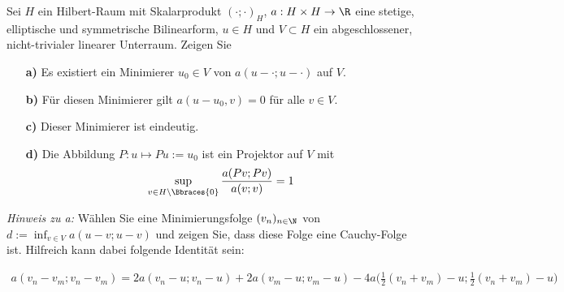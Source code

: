 
\begin{exercise}

Sei $H$ ein Hilbert-Raum mit Skalarprodukt $(\cdot;\cdot)_H$, $a : H \times H \rightarrow \R$
eine stetige, elliptische und symmetrische Bilinearform, $u \in H$ und $V \subset H$ ein abgeschlossener,
nicht-trivialer linearer Unterraum. Zeigen Sie
\begin{itemize}
  \item[\textbf{a)}]
    Es existiert ein Minimierer $u_0 \in V$ von $a(u- \cdot; u- \cdot)$ auf $V$.
  \item[\textbf{b)}]
    Für diesen Minimierer gilt $a(u-u_0,v) = 0$ für alle $v \in V$.
  \item[\textbf{c)}]
    Dieser Minimierer ist eindeutig.
  \item[\textbf{d)}]
    Die Abbildung $P: u \mapsto Pu := u_0$ ist ein Projektor auf $V$ mit
    \begin{align}
      \sup_{v \in H \setminus \Bbraces{0}}
      \frac{a(Pv;Pv)}{a(v;v)} = 1
    \end{align}
\end{itemize}
\textit{Hinweis zu a:} Wählen Sie eine Minimierungsfolge $(v_n)_{n \in \N}$ von
$d := \inf_{v \in V} a(u-v;u-v)$ und zeigen Sie, dass diese Folge eine Cauchy-Folge ist.
Hilfreich kann dabei folgende Identität sein:

\begin{align}
  a(v_n - v_m ; v_n - v_m )
  =
  2a(v_n - u; v_n - u) + 2a(v_m - u; v_m - u) -
  4a\Bigg(\frac{1}{2}(v_n + v_m ) - u;\frac{1}{2}(v_n + v_m )- u\Bigg)
\end{align}
\end{exercise}


